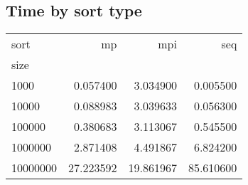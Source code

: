 \documentclass[varwidth=true, border=10pt, convert={size=640x}]{standalone}%
\begin{document}
%
\begin{center}
\normalsize%
\section{Time by sort type}%
\label{sec:Timebysorttype}%
\begin{tabular}{lrrr}
\toprule
sort & mp & mpi & seq \\
size &  &  &  \\
\midrule
1000 & 0.057400 & 3.034900 & 0.005500 \\
10000 & 0.088983 & 3.039633 & 0.056300 \\
100000 & 0.380683 & 3.113067 & 0.545500 \\
1000000 & 2.871408 & 4.491867 & 6.824200 \\
10000000 & 27.223592 & 19.861967 & 85.610600 \\
\bottomrule
\end{tabular}
\end{center}
%
\end{document}
